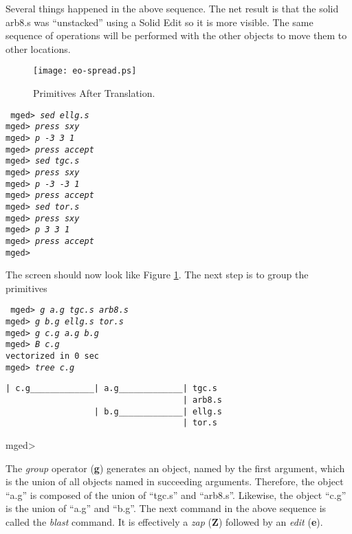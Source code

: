 Several things happened in the above sequence.  The net result is that
the solid arb8.s was ``unstacked'' using a Solid Edit so it is more
visible.  The same sequence of operations will be performed with the
other objects to move them to other locations.

\begin{figure}
\centering \texttt{[image: eo-spread.ps]}
\caption{Primitives After Translation.}
\label{eo-spread}
\end{figure}

\noindent
{\tt
mged> {\em sed ellg.s}\\
mged> {\em press sxy}\\
mged> {\em p -3 3 1}\\
mged> {\em press accept}\\
mged> {\em sed tgc.s}\\
mged> {\em press sxy}\\
mged> {\em p -3 -3 1}\\
mged> {\em press accept}\\
mged> {\em sed tor.s}\\
mged> {\em press sxy}\\
mged> {\em p 3 3 1}\\
mged> {\em press accept}\\
mged>\\
}

The screen should now look like Figure \ref{eo-spread}.  The next step
is to group the primitives

\noindent
{\tt
mged> {\em g a.g tgc.s arb8.s}\\
mged> {\em g b.g ellg.s tor.s}\\
mged> {\em g c.g a.g b.g}\\
mged> {\em B c.g}\\
vectorized in 0 sec\\
mged> {\em tree c.g}
\begin{verbatim}
| c.g_____________| a.g_____________| tgc.s
                                    | arb8.s
                  | b.g_____________| ellg.s
                                    | tor.s
\end{verbatim}
\noindent
mged>\\
}

The {\em group} operator ({\bf g}) generates an object, named by the
first argument, which is the union of all objects named in succeeding
arguments.  Therefore, the object ``a.g'' is composed of the union of
``tgc.s'' and ``arb8.s''.  Likewise, the object ``c.g'' is the union of
``a.g'' and ``b.g''.  The next command in the above sequence is called
the {\em blast} command.  It is effectively a {\em zap} ({\bf Z})
followed by an {\em edit} ({\bf e}).

